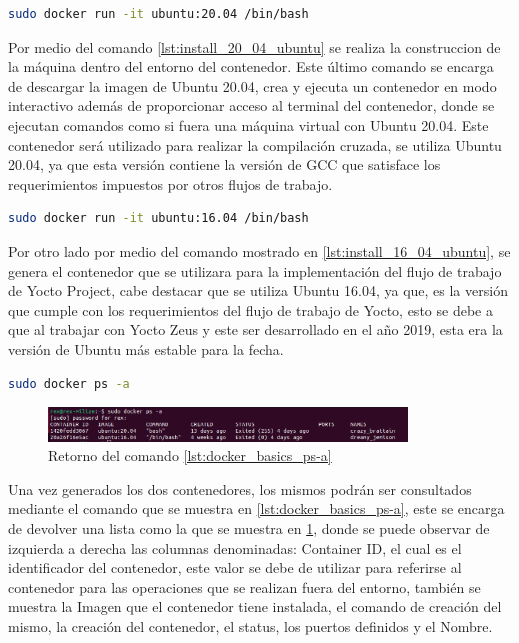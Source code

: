 \begin{lstlisting}[language=bash, caption={Instalacion de Ubuntu 20.04, Linux}, label=lst:install_20_04_ubuntu]
    sudo docker run -it ubuntu:20.04 /bin/bash
\end{lstlisting}

Por medio del comando \ref{lst:install_20_04_ubuntu} se realiza la construccion de la máquina dentro del entorno del contenedor. Este último comando se encarga de descargar la imagen de Ubuntu 20.04, crea y ejecuta un contenedor en modo interactivo además de proporcionar acceso al terminal del contenedor, donde se ejecutan comandos como si fuera una máquina virtual con Ubuntu 20.04. Este contenedor será utilizado para realizar la compilación cruzada, se utiliza Ubuntu 20.04, ya que esta versión contiene la versión de GCC que satisface los requerimientos impuestos por otros flujos de trabajo.

\begin{lstlisting}[language=bash, caption={Instalacion de Ubuntu 16.04, Linux}, label=lst:install_16_04_ubuntu]
    sudo docker run -it ubuntu:16.04 /bin/bash
\end{lstlisting}

Por otro lado por medio del comando mostrado en \ref{lst:install_16_04_ubuntu}, se genera el contenedor que se utilizara para la implementación del flujo de trabajo de Yocto Project, cabe destacar que se utiliza Ubuntu 16.04, ya que, es la versión que cumple con los requerimientos del flujo de trabajo de Yocto, esto se debe a que al trabajar con Yocto Zeus y este ser desarrollado en el año 2019, esta era la versión de Ubuntu más estable para la fecha. 

\begin{lstlisting}[language=bash, caption={Lista de contenedores del sistema, Docker}, label=lst:docker_basics_ps-a]
    sudo docker ps -a
\end{lstlisting}

\begin{figure}[h!]
    \centering
    \includegraphics[width=0.85\textwidth]{fig/especifico_2/retornos_de_comandos/sudo_docker_ps_a.png}
    \caption{Retorno del comando \ref{lst:docker_basics_ps-a}}
    \label{fig:sudo_docker_ps_a}
\end{figure}

Una vez generados los dos contenedores, los mismos podrán ser consultados mediante el comando que se muestra en \ref{lst:docker_basics_ps-a}, este se encarga de devolver una lista como la que se muestra en \ref{fig:sudo_docker_ps_a}, donde se puede observar de izquierda a derecha las columnas denominadas: Container ID, el cual es el identificador del contenedor, este valor se debe de utilizar para referirse al contenedor para las operaciones que se realizan fuera del entorno, también se muestra la Imagen que el contenedor tiene instalada, el comando de creación del mismo, la creación del contenedor, el status, los puertos definidos y el Nombre.

